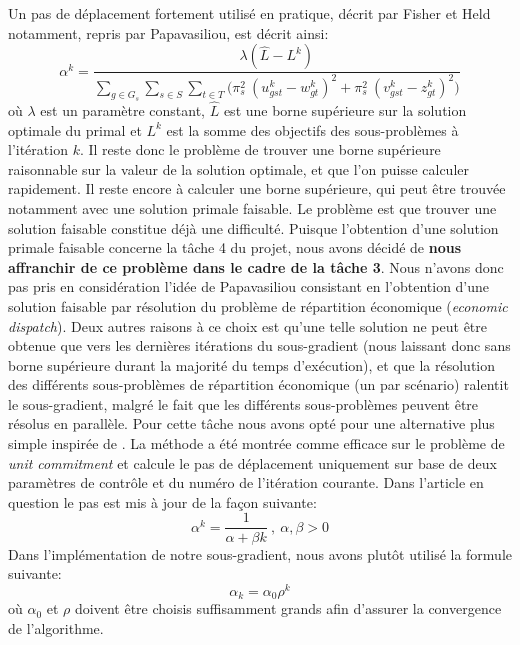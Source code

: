 Un pas de déplacement fortement utilisé en pratique, décrit par Fisher et Held notamment, repris par Papavasiliou, est décrit ainsi:
\begin{equation}
    \alpha^k = \frac{\lambda (\hat{L} - L^k)}{\sum\limits_{g \in G_s} \sum\limits_{s \in S} \sum\limits_{t \in T} \big(\pi_s^2 \ (u_{gst}^k - w_{gt}^k)^2 + \pi_s^2 \ (v_{gst}^k - z_{gt}^k)^2\big)}
\end{equation}
où $\lambda$ est un paramètre constant, $\hat{L}$ est une borne supérieure sur la solution optimale du primal et $L^k$ est la somme des objectifs des sous-problèmes
à l'itération $k$. Il reste donc le problème de trouver une borne supérieure raisonnable sur la valeur de la solution optimale,
et que l'on puisse calculer rapidement. Il reste encore à calculer une borne supérieure, qui peut être trouvée notamment avec une solution primale faisable.
Le problème est que trouver une solution faisable constitue déjà une difficulté. Puisque l'obtention d'une solution primale faisable
concerne la tâche 4 du projet, nous avons décidé de \textbf{nous affranchir de ce problème dans le cadre de la tâche 3}.
Nous n'avons donc pas pris en considération l'idée de Papavasiliou consistant en l'obtention d'une solution faisable par résolution
du problème de répartition économique (\textit{economic dispatch}).
Deux autres raisons à ce choix est qu'une telle solution ne peut être obtenue que vers les dernières itérations du sous-gradient
(nous laissant donc sans borne supérieure durant la majorité du temps d'exécution), et que la résolution des différents sous-problèmes
de répartition économique (un par scénario) ralentit le sous-gradient, malgré le fait que les différents sous-problèmes peuvent être résolus en parallèle.
Pour cette tâche nous avons opté pour une alternative plus simple inspirée de \citep{Zhuang1988}.
La méthode a été montrée comme efficace sur le problème de \textit{unit commitment} et calcule le pas de déplacement uniquement
sur base de deux paramètres de contrôle et du numéro de l'itération courante. Dans l'article en question le pas est mis à jour de la façon suivante:
\begin{equation}
    \alpha^k = \frac{1}{\alpha + \beta k} \ , \  \alpha, \beta > 0
\end{equation}
Dans l'implémentation de notre sous-gradient, nous avons plutôt utilisé la formule suivante:
\begin{equation}
    \alpha_k = \alpha_0 \rho^k
\end{equation}
où $\alpha_0$ et $\rho$ doivent être choisis suffisamment grands afin d'assurer la convergence de l'algorithme.